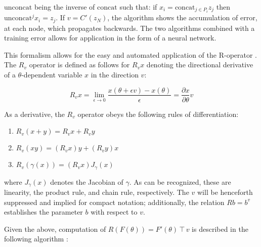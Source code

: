 \begin{algorithmic}[1]
    \EndFor
    \EndFor
\end{algorithmic}

\noindent
$\text{unconcat}$ being the inverse of $\text{concat}$ such that: if $x_i = \text{concat}_{j\in P_i} z_j$ then $\text{unconcat}^j x_i = z_j$. If $v = C'(z_N)$, the algorithm shows the accumulation of error, at each node, which propagates backwards. The two algorithms combined with a training error allows for application in the form of a neural network. 

This formalism allows for the easy and automated application of the R-operator \cite{pepe}. The $R_v$ operator is defined as follows for $R_vx $ denoting the directional derivative of a $\theta$-dependent variable $x$ in the direction $v$:

\[R_vx = \lim_{\epsilon\to 0} \frac{x(\theta + \epsilon v) - x(\theta)}{\epsilon} = \frac{\partial x}{\partial\theta}v\]

\noindent
As a derivative, the $R_v$ operator obeys the following rules of differentiation:

\begin{enumerate}
    \item $R_v(x+y) = R_vx + R_vy$
    \item $ R_v(xy) = (R_vx)y + (R_vy)x $
    \item $R_v(\gamma(x)) = (R_vx) J_{\gamma}(x)$
\end{enumerate}

\noindent
where $J_\gamma(x)$ denotes the Jacobian of $\gamma$. As can be recognized, these are linearity, the product rule, and chain rule, respectively. The $v$ will be henceforth suppressed and implied for compact notation; additionally, the relation $Rb = b^v$ establishes the parameter $b$ with respect to $v$.

Given the above, computation of $R(F(\theta)) = F'(\theta)\intercal v$ is described in the following algorithm \cite{suts}:

\begin{algorithmic}[1]
    \EndFor
\end{algorithmic}

